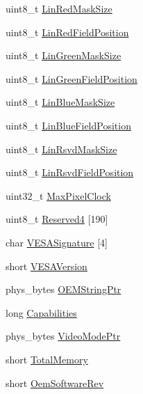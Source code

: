 \begin{DoxyCompactItemize}
\item 
uint8\+\_\+t \hyperlink{struct____attribute_____a88a5ced225c9ef7ed6ffe33e5a39edc6}{Lin\+Red\+Mask\+Size}
\item 
uint8\+\_\+t \hyperlink{struct____attribute_____aec8d45f188ac9210b88216af83de847d}{Lin\+Red\+Field\+Position}
\item 
uint8\+\_\+t \hyperlink{struct____attribute_____a5768a84391f8a26d8a9bfd6a22d5e49d}{Lin\+Green\+Mask\+Size}
\item 
uint8\+\_\+t \hyperlink{struct____attribute_____a5571b1959950d520f2b45bb5549994e3}{Lin\+Green\+Field\+Position}
\item 
uint8\+\_\+t \hyperlink{struct____attribute_____aa2b79b8eed8d842e0db481fb1fbb9a06}{Lin\+Blue\+Mask\+Size}
\item 
uint8\+\_\+t \hyperlink{struct____attribute_____a99e6b6bdbda9f98f2823429dfd5b5685}{Lin\+Blue\+Field\+Position}
\item 
uint8\+\_\+t \hyperlink{struct____attribute_____a577b5892a22d06e230f528a62a472d1d}{Lin\+Rsvd\+Mask\+Size}
\item 
uint8\+\_\+t \hyperlink{struct____attribute_____a012126db503ad1281ae53aa41f4c96a7}{Lin\+Rsvd\+Field\+Position}
\item 
uint32\+\_\+t \hyperlink{struct____attribute_____afd81a69353c35e8b1fb9b696931f79a5}{Max\+Pixel\+Clock}
\item 
uint8\+\_\+t \hyperlink{struct____attribute_____ab859fb715f83f005dfa2f13d8b0e4ff0}{Reserved4} \mbox{[}190\mbox{]}
\item 
char \hyperlink{struct____attribute_____ae836dd2f0cf91de8d1387bc606feb595}{V\+E\+S\+A\+Signature} \mbox{[}4\mbox{]}
\item 
short \hyperlink{struct____attribute_____a14e4fe3377969955c48963300b715b37}{V\+E\+S\+A\+Version}
\item 
phys\+\_\+bytes \hyperlink{struct____attribute_____a6412609805e1bc6e48f7743a48dc841a}{O\+E\+M\+String\+Ptr}
\item 
long \hyperlink{struct____attribute_____a6dc2748c4ab226b9cbf6e7139fa24f74}{Capabilities}
\item 
phys\+\_\+bytes \hyperlink{struct____attribute_____ac3b2d0805352b33b6bb2610883e89e22}{Video\+Mode\+Ptr}
\item 
short \hyperlink{struct____attribute_____aad8c231af30c4ba0005f5bca523ecfc8}{Total\+Memory}
\item 
short \hyperlink{struct____attribute_____a4a00a2a7929046f2256d374d7182b3ad}{Oem\+Software\+Rev}
\item 

\end{DoxyCompactItemize}
